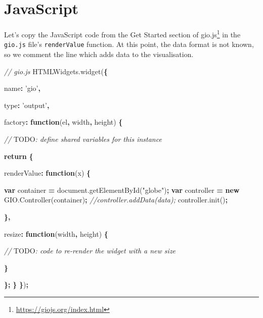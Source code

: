 \documentclass[10pt,]{krantz}
\makeatletter
\newenvironment{Shaded}{\begin{snugshade}}{\end{snugshade}}
\newcommand{\AlertTok}[1]{\textcolor[rgb]{0.33,0.33,0.33}{#1}}
\newcommand{\AttributeTok}[1]{\textcolor[rgb]{0.61,0.61,0.61}{#1}}
\newcommand{\CommentTok}[1]{\textcolor[rgb]{0.37,0.37,0.37}{\textit{#1}}}
\newcommand{\ControlFlowTok}[1]{\textcolor[rgb]{0.27,0.27,0.27}{\textbf{#1}}}
\newcommand{\DataTypeTok}[1]{\textcolor[rgb]{0.27,0.27,0.27}{#1}}
\newcommand{\KeywordTok}[1]{\textcolor[rgb]{0.27,0.27,0.27}{\textbf{#1}}}
\newcommand{\NormalTok}[1]{#1}
\newcommand{\OperatorTok}[1]{\textcolor[rgb]{0.43,0.43,0.43}{\textbf{#1}}}
\newcommand{\StringTok}[1]{\textcolor[rgb]{0.5,0.5,0.5}{#1}}
\newcommand{\VariableTok}[1]{\textcolor[rgb]{0,0,0}{#1}}
\renewcommand{\href}[2]{#2\footnote{\url{#1}}}
\newenvironment{kframe}{%
\medskip{}
\setlength{\fboxsep}{.8em}
 \def\at@end@of@kframe{}%
 \ifinner\ifhmode%
  \def\at@end@of@kframe{\end{minipage}}%
  \begin{minipage}{\columnwidth}%
 \fi\fi%
 \def\FrameCommand##1{\hskip\@totalleftmargin \hskip-\fboxsep
 \colorbox{shadecolor}{##1}\hskip-\fboxsep
     \hskip-\linewidth \hskip-\@totalleftmargin \hskip\columnwidth}%
 \MakeFramed {\advance\hsize-\width
   \@totalleftmargin\z@ \linewidth\hsize
   \@setminipage}}%
 {\par\unskip\endMakeFramed%
 \at@end@of@kframe}
\renewenvironment{Shaded}{\begin{kframe}}{\end{kframe}}
\makeatother
\begin{document}
\hypertarget{widgets-full-js}{%
\section{JavaScript}\label{widgets-full-js}}

Let's copy the JavaScript code from the \href{https://giojs.org/index.html}{Get Started section of gio.js} in the \texttt{gio.js} file's \texttt{renderValue} function. At this point, the data format is not known, so we comment the line which adds data to the visualisation.

\begin{Shaded}
\begin{Highlighting}[]
\CommentTok{// gio.js}
\VariableTok{HTMLWidgets}\NormalTok{.}\AttributeTok{widget}\NormalTok{(}\OperatorTok{\{}

  \DataTypeTok{name}\OperatorTok{:} \StringTok{'gio'}\OperatorTok{,}

  \DataTypeTok{type}\OperatorTok{:} \StringTok{'output'}\OperatorTok{,}

  \DataTypeTok{factory}\OperatorTok{:} \KeywordTok{function}\NormalTok{(el}\OperatorTok{,}\NormalTok{ width}\OperatorTok{,}\NormalTok{ height) }\OperatorTok{\{}

    \CommentTok{// }\AlertTok{TODO}\CommentTok{: define shared variables for this instance}

    \ControlFlowTok{return} \OperatorTok{\{}

      \DataTypeTok{renderValue}\OperatorTok{:} \KeywordTok{function}\NormalTok{(x) }\OperatorTok{\{}

        \KeywordTok{var}\NormalTok{ container }\OperatorTok{=} \VariableTok{document}\NormalTok{.}\AttributeTok{getElementById}\NormalTok{(}\StringTok{"globe"}\NormalTok{)}\OperatorTok{;}
        \KeywordTok{var}\NormalTok{ controller }\OperatorTok{=} \KeywordTok{new} \VariableTok{GIO}\NormalTok{.}\AttributeTok{Controller}\NormalTok{(container)}\OperatorTok{;}
        \CommentTok{//controller.addData(data);}
        \VariableTok{controller}\NormalTok{.}\AttributeTok{init}\NormalTok{()}\OperatorTok{;}

      \OperatorTok{\},}

      \DataTypeTok{resize}\OperatorTok{:} \KeywordTok{function}\NormalTok{(width}\OperatorTok{,}\NormalTok{ height) }\OperatorTok{\{}

        \CommentTok{// }\AlertTok{TODO}\CommentTok{: code to re-render the widget with a new size}

      \OperatorTok{\}}

    \OperatorTok{\};}
  \OperatorTok{\}}
\OperatorTok{\}}\NormalTok{)}\OperatorTok{;}
\end{Highlighting}
\end{Shaded}
\end{document}
